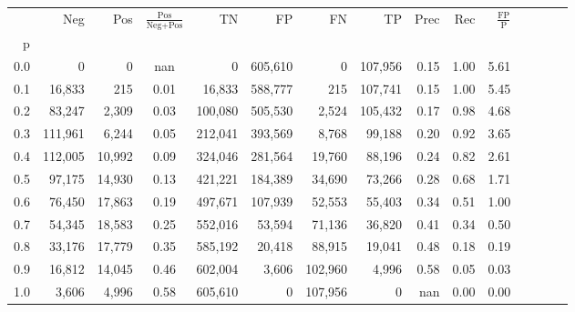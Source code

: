 \begin{tabular}{rrrcrrrrrrrrrrr}
\toprule
{} &      Neg &     Pos & $\frac{\text{Pos}}{\text{Neg}+\text{Pos}}$ &       TN &       FP &       FN &       TP &  Prec &   Rec & $\frac{\text{FP}}{\text{P}}$ \\
p   &          &         &                                            &          &          &          &          &       &       &                              \\
\midrule
0.0 &        0 &       0 &                                        nan &        0 &  605,610 &        0 &  107,956 &  0.15 &  1.00 &                         5.61 \\
0.1 &   16,833 &     215 &                                       0.01 &   16,833 &  588,777 &      215 &  107,741 &  0.15 &  1.00 &                         5.45 \\
0.2 &   83,247 &   2,309 &                                       0.03 &  100,080 &  505,530 &    2,524 &  105,432 &  0.17 &  0.98 &                         4.68 \\
0.3 &  111,961 &   6,244 &                                       0.05 &  212,041 &  393,569 &    8,768 &   99,188 &  0.20 &  0.92 &                         3.65 \\
0.4 &  112,005 &  10,992 &                                       0.09 &  324,046 &  281,564 &   19,760 &   88,196 &  0.24 &  0.82 &                         2.61 \\
0.5 &   97,175 &  14,930 &                                       0.13 &  421,221 &  184,389 &   34,690 &   73,266 &  0.28 &  0.68 &                         1.71 \\
0.6 &   76,450 &  17,863 &                                       0.19 &  497,671 &  107,939 &   52,553 &   55,403 &  0.34 &  0.51 &                         1.00 \\
0.7 &   54,345 &  18,583 &                                       0.25 &  552,016 &   53,594 &   71,136 &   36,820 &  0.41 &  0.34 &                         0.50 \\
0.8 &   33,176 &  17,779 &                                       0.35 &  585,192 &   20,418 &   88,915 &   19,041 &  0.48 &  0.18 &                         0.19 \\
0.9 &   16,812 &  14,045 &                                       0.46 &  602,004 &    3,606 &  102,960 &    4,996 &  0.58 &  0.05 &                         0.03 \\
1.0 &    3,606 &   4,996 &                                       0.58 &  605,610 &        0 &  107,956 &        0 &   nan &  0.00 &                         0.00 \\
\bottomrule
\end{tabular}
